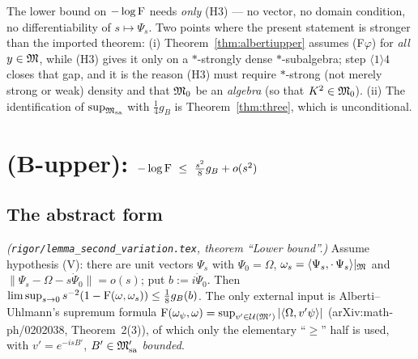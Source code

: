 \documentclass[11pt]{article}
\newcommand{\Om}{\Omega}
\newcommand{\ip}[2]{\langle#1,#2\rangle}
\newcommand{\norm}[1]{\lVert#1\rVert}
\newcommand{\Msa}{\cM_{\mathrm{sa}}}
\newcommand{\Mpsa}{\cM'_{\mathrm{sa}}}
\newcommand{\gB}{g_B}
\newcommand{\U}{\mathcal U}
\begin{document}
\begin{verdictok}
The lower bound on $-\log\operatorname{F}$ needs \emph{only} (H3) --- no vector, no domain condition, no differentiability
of $s\mapsto\Psi_s$.  Two points where the present statement is stronger than the imported theorem:
(i) Theorem~\ref{thm:albertiupper} assumes (F$\varphi$) for \emph{all} $y\in\mathfrak M$, while (H3) gives it only on
a $*$-strongly dense $*$-subalgebra; step $\langle1\rangle4$ closes that gap, and it is the reason (H3) must
require $*$-strong (not merely strong or weak) density and that $\mathfrak M_0$ be an \emph{algebra}
(so that $K^2\in\mathfrak M_0$).  (ii) The identification of $\sup_{\Msa}$ with $\frac14\gB$ is
Theorem~\ref{thm:three}, which is unconditional.
\end{verdictok}

\section{(B-upper): $-\log\Fid\ \le\ \frac{s^2}8\gB+o(s^2)$}\label{sec:upper}

\subsection{The abstract form}

\begin{theorem}\label{thm:uhllower}
\emph{(\texttt{rigor/lemma\_second\_variation.tex}, theorem ``Lower bound''.)}  Assume hypothesis
\textup{(V)}: there are unit vectors $\Psi_s$ with $\Psi_0=\Om$, $\omega_s=\ip{\Psi_s}{\cdot\,\Psi_s}|_\cM$
and $\norm{\Psi_s-\Om-s\dot\Psi_0}=o(s)$; put $b:=i\dot\Psi_0$.  Then
$\limsup_{s\to0}s^{-2}(1-\Fid(\omega,\omega_s))\le\frac18\gB(b)$.
The only external input is Alberti--Uhlmann's supremum formula
$\Fid(\omega_\psi,\omega)=\sup_{v'\in\U(\cM')}|\ip\Om{v'\psi}|$ (arXiv:math-ph/0202038, Theorem~2(3)),
of which only the elementary ``$\ge$'' half is used, with $v'=e^{-isB'}$, $B'\in\Mpsa$ \emph{bounded}.
\end{theorem}
\end{document}
